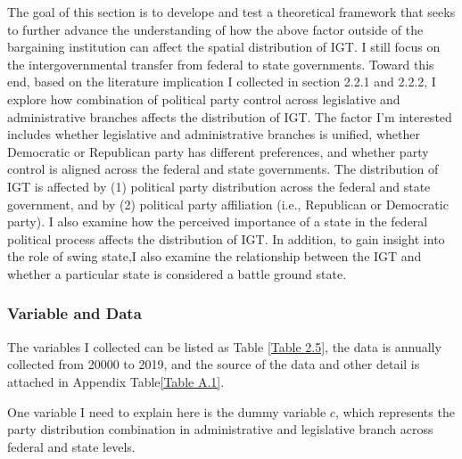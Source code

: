 The goal of this section is to  develope and test a theoretical framework that seeks to further advance the understanding of how the above factor outside of the bargaining institution can affect the spatial distribution of IGT. I still focus on the intergovernmental transfer from federal to state governments. Toward this end, based on the literature implication I collected in section 2.2.1 and 2.2.2, I explore how combination of political party control across legislative and administrative branches affects the distribution of IGT. The factor I'm interested includes whether legislative and administrative branches is unified, whether Democratic or Republican party has different preferences, and whether party control is aligned across the federal and state governments. The distribution of IGT is affected by (1) political party distribution across the federal and state government, and by (2) political party affiliation (i.e., Republican or Democratic party). I also examine how the perceived importance of a state in the federal political process affects the distribution of IGT. In addition, to gain insight into the role of swing state,I also examine the relationship between the IGT and whether a particular state is considered a battle ground state.

\subsubsection{Variable and Data}
The variables I collected can be listed as Table \ref*{Table 2.5}, the data is annually collected from 20000 to 2019, and the source of the data and other detail is attached in Appendix Table\ref*{Table A.1}.

One variable I need to explain here is the dummy variable $c$, which represents the party distribution combination in administrative and legislative branch across federal and state levels.


